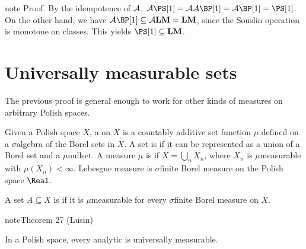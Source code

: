 \documentclass[letterpaper,10pt,english]{jupyterBook}
\begin{document}
\begin{sphinxadmonition}{note}
\sphinxAtStartPar
Proof. By the idempotence of \({\cal A}\), \({\cal A}\PS[1] = {\cal A}{\cal
  A}\BP[1] = {\cal A}\BP[1] = \PS[1]\). On the other hand, we have \({\cal A}\BP[1] \subseteq
{\cal A}\mathbf{LM} = \mathbf{LM}\), since the Souslin operation is monotone on
classes. This yields \(\PS[1] \subseteq \mathbf{LM}\).
\end{sphinxadmonition}


\section{Universally measurable sets}
\label{\detokenize{regularityAnalytic:universally-measurable-sets}}
\sphinxAtStartPar
The previous proof is general enough to work for other kinds of
measures on arbitrary Polish spaces.

\sphinxAtStartPar
Given a Polish space \(X\), a  on \(X\) is a
countably additive set function \(\mu\) defined on a \(\sigma\)\sphinxhyphen{}algebra of the
Borel sets in \(X\). A set is  if it can be
represented as a union of a Borel set and a \(\mu\)\sphinxhyphen{}nullset. A measure \(\mu\)
is  if \(X = \bigcup_n X_n\), where \(X_n\) is
\(\mu\)\sphinxhyphen{}measurable with \(\mu(X_n) < \infty\). Lebesgue
measure is \(\sigma\)\sphinxhyphen{}finite Borel measure on the Polish space \(\Real\).

\sphinxAtStartPar
A set \(A \subseteq X\) is  if it is
\(\mu\)\sphinxhyphen{}measurable for every \(\sigma\)\sphinxhyphen{}finite Borel measure on \(X\).
\label{regularityAnalytic:thm-analytic-universally-measurable}
\begin{sphinxadmonition}{note}{Theorem 27 (Lusin)}



\sphinxAtStartPar
In a Polish space, every analytic is universally measurable.
\end{sphinxadmonition}
\end{document}
